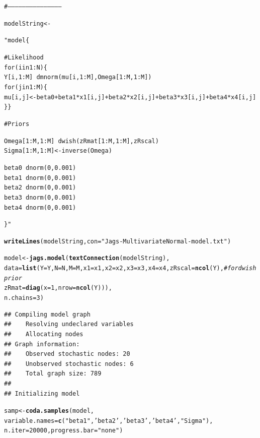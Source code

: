 \documentclass[11pt,a4paper,twoside]{book}\usepackage[]{graphicx}\usepackage[]{color}
\makeatletter
\newcommand{\hlnum}[1]{\textcolor[rgb]{0.686,0.059,0.569}{#1}}%
\newcommand{\hlstr}[1]{\textcolor[rgb]{0.192,0.494,0.8}{#1}}%
\newcommand{\hlcom}[1]{\textcolor[rgb]{0.678,0.584,0.686}{\textit{#1}}}%
\newcommand{\hlstd}[1]{\textcolor[rgb]{0.345,0.345,0.345}{#1}}%
\newcommand{\hlkwb}[1]{\textcolor[rgb]{0.69,0.353,0.396}{#1}}%
\newcommand{\hlkwc}[1]{\textcolor[rgb]{0.333,0.667,0.333}{#1}}%
\newcommand{\hlkwd}[1]{\textcolor[rgb]{0.737,0.353,0.396}{\textbf{#1}}}%
\newenvironment{kframe}{%
 \def\at@end@of@kframe{}%
 \ifinner\ifhmode%
  \def\at@end@of@kframe{\end{minipage}}%
  \begin{minipage}{\columnwidth}%
 \fi\fi%
 \def\FrameCommand##1{\hskip\@totalleftmargin \hskip-\fboxsep
 \colorbox{shadecolor}{##1}\hskip-\fboxsep
     \hskip-\linewidth \hskip-\@totalleftmargin \hskip\columnwidth}%
 \MakeFramed {\advance\hsize-\width
   \@totalleftmargin\z@ \linewidth\hsize
   \@setminipage}}%
 {\par\unskip\endMakeFramed%
 \at@end@of@kframe}
\newenvironment{knitrout}{}{} %
\makeatother
\begin{document}
\begin{knitrout}
\color{fgcolor}\begin{kframe}
\begin{alltt}
\hlcom{#--------------------------------------------}

\hlstd{modelString} \hlkwb{<-} \hlstr{"model\{

# Likelihood
for(i in 1:N)\{
Y[i,1:M] ~ dmnorm(mu[i,1:M],Omega[1:M,1:M])
for(j in 1:M)\{
mu[i,j] <- beta0 + beta1*x1[i,j]+ beta2*x2[i,j]+ beta3*x3[i,j] + beta4*x4[i,j]  
\}\}

# Priors

Omega[1:M, 1:M] ~dwish(zRmat[1:M,1:M] , zRscal)
Sigma[1:M, 1:M] <- inverse(Omega)

beta0      ~ dnorm(0,0.001)
beta1      ~ dnorm(0,0.001)
beta2      ~ dnorm(0,0.001)
beta3      ~ dnorm(0,0.001)
beta4      ~ dnorm(0,0.001)

\}"}


\hlkwd{writeLines}\hlstd{( modelString ,} \hlkwc{con}\hlstd{=}\hlstr{"Jags-MultivariateNormal-model.txt"} \hlstd{)}

\hlstd{model} \hlkwb{<-} \hlkwd{jags.model}\hlstd{(}\hlkwd{textConnection}\hlstd{(modelString),}
                                                                                \hlkwc{data} \hlstd{=} \hlkwd{list}\hlstd{(}\hlkwc{Y}\hlstd{=Y,}\hlkwc{N}\hlstd{=N,}\hlkwc{M}\hlstd{=M,}\hlkwc{x1} \hlstd{= x1,} \hlkwc{x2} \hlstd{= x2,} \hlkwc{x3} \hlstd{= x3,} \hlkwc{x4} \hlstd{= x4,}     \hlkwc{zRscal} \hlstd{=} \hlkwd{ncol}\hlstd{(Y) ,}  \hlcom{# for dwish prior}
                                                                                                                                \hlkwc{zRmat} \hlstd{=} \hlkwd{diag}\hlstd{(}\hlkwc{x}\hlstd{=}\hlnum{1}\hlstd{,}\hlkwc{nrow}\hlstd{=}\hlkwd{ncol}\hlstd{(Y)) ),}
                                                                                \hlkwc{n.chains}\hlstd{=}\hlnum{3}\hlstd{)}
\end{alltt}
\begin{verbatim}
## Compiling model graph
##    Resolving undeclared variables
##    Allocating nodes
## Graph information:
##    Observed stochastic nodes: 20
##    Unobserved stochastic nodes: 6
##    Total graph size: 789
## 
## Initializing model
\end{verbatim}
\begin{alltt}
\hlstd{samp} \hlkwb{<-} \hlkwd{coda.samples}\hlstd{(model,}
                                                                                 \hlkwc{variable.names}\hlstd{=}\hlkwd{c}\hlstd{(}\hlstr{"beta1"}\hlstd{,}\hlstr{'beta2'}\hlstd{,} \hlstr{'beta3'}\hlstd{,} \hlstr{'beta4'} \hlstd{,}\hlstr{"Sigma"}\hlstd{),}
                                                                                 \hlkwc{n.iter}\hlstd{=}\hlnum{20000}\hlstd{,} \hlkwc{progress.bar}\hlstd{=}\hlstr{"none"}\hlstd{)}


\end{alltt}
\end{kframe}
\end{knitrout}
\end{document}

